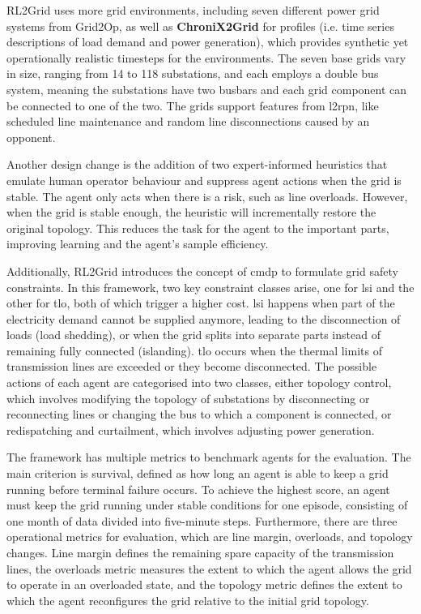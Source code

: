 RL2Grid uses more grid environments, including seven different power grid systems from Grid2Op, as well as \textbf{ChroniX2Grid} for profiles (i.e. time series descriptions of load demand and power generation), which provides synthetic yet operationally realistic timesteps for the environments. The seven base grids vary in size, ranging from 14 to 118 substations, and each employs a double bus system, meaning the substations have two busbars and each grid component can be connected to one of the two. The grids support features from \ac{l2rpn}, like scheduled line maintenance and random line disconnections caused by an opponent.

Another design change is the addition of two expert-informed heuristics that emulate human operator behaviour and suppress agent actions when the grid is stable. The agent only acts when there is a risk, such as line overloads. However, when the grid is stable enough, the heuristic will incrementally restore the original topology. This reduces the task for the agent to the important parts, improving learning and the agent's sample efficiency. 

Additionally, RL2Grid introduces the concept of \ac{cmdp} to formulate grid safety constraints. In this framework, two key constraint classes arise, one for \ac{lsi} and the other for \ac{tlo}, both of which trigger a higher cost. \ac{lsi} happens when part of the electricity demand cannot be supplied anymore, leading to the disconnection of loads (load shedding), or when the grid splits into separate parts instead of remaining fully connected (islanding). \ac{tlo} occurs when the thermal limits of transmission lines are exceeded or they become disconnected.
The possible actions of each agent are categorised into two classes, either topology control, which involves modifying the topology of substations by disconnecting or reconnecting lines or changing the bus to which a component is connected, or redispatching and curtailment, which involves adjusting power generation. 

The framework has multiple metrics to benchmark agents for the evaluation. The main criterion is survival, defined as how long an agent is able to keep a grid running before terminal failure occurs. To achieve the highest score, an agent must keep the grid running under stable conditions for one episode, consisting of one month of data divided into five-minute steps. 
Furthermore, there are three operational metrics for evaluation, which are line margin, overloads, and topology changes. Line margin defines the remaining spare capacity of the transmission lines, the overloads metric measures the extent to which the agent allows the grid to operate in an overloaded state, and the topology metric defines the extent to which the agent reconfigures the grid relative to the initial grid topology.

